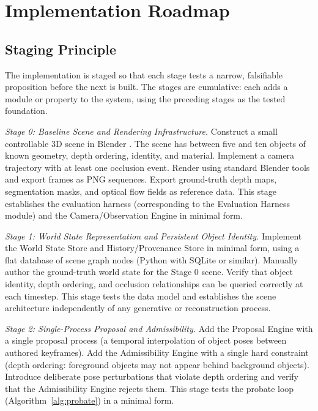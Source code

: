 \documentclass[11pt,a4paper]{article}
\theoremstyle{plain}
\theoremstyle{definition}
\theoremstyle{remark}
\begin{document}
\section{Implementation Roadmap}
\label{sec:implementation}

\subsection{Staging Principle}

The implementation is staged so that each stage tests a narrow, falsifiable proposition before the next is built. The stages are cumulative: each adds a module or property to the system, using the preceding stages as the tested foundation.

\textit{Stage 0: Baseline Scene and Rendering Infrastructure.} Construct a small controllable 3D scene in Blender \cite{blender2024}. The scene has between five and ten objects of known geometry, depth ordering, identity, and material. Implement a camera trajectory with at least one occlusion event. Render using standard Blender tools and export frames as PNG sequences. Export ground-truth depth maps, segmentation masks, and optical flow fields as reference data. This stage establishes the evaluation harness (corresponding to the Evaluation Harness module) and the Camera/Observation Engine in minimal form.

\textit{Stage 1: World State Representation and Persistent Object Identity.} Implement the World State Store and History/Provenance Store in minimal form, using a flat database of scene graph nodes (Python with SQLite or similar). Manually author the ground-truth world state for the Stage 0 scene. Verify that object identity, depth ordering, and occlusion relationships can be queried correctly at each timestep. This stage tests the data model and establishes the scene architecture independently of any generative or reconstruction process.

\textit{Stage 2: Single-Process Proposal and Admissibility.} Add the Proposal Engine with a single proposal process (a temporal interpolation of object poses between authored keyframes). Add the Admissibility Engine with a single hard constraint (depth ordering: foreground objects may not appear behind background objects). Introduce deliberate pose perturbations that violate depth ordering and verify that the Admissibility Engine rejects them. This stage tests the probate loop (Algorithm~\ref{alg:probate}) in a minimal form.
\end{document}
